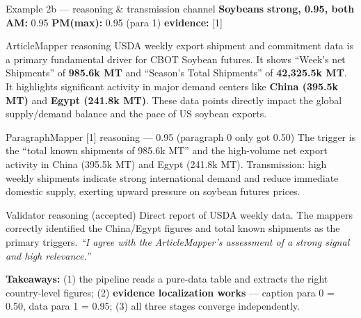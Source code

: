 \documentclass[10pt,aspectratio=169]{beamer}
\begin{document}
\begin{frame}{Example 2b --- reasoning \& transmission channel}
  \scriptsize
  \textbf{\textcolor{triggerblue}{Soybeans}} \quad [commodity] \quad \textbf{strong, 0.95, both}
  \quad \textbf{AM:} 0.95 \quad \textbf{PM(max):} 0.95 (para 1) \quad \textbf{evidence:} [1]

  \vspace{0.3em}
  \begin{block}{ArticleMapper reasoning}
    \scriptsize
    USDA weekly export shipment and commitment data is a primary fundamental driver for CBOT
    Soybean futures. It shows ``Week's net Shipments'' of \textbf{985.6k MT} and ``Season's
    Total Shipments'' of \textbf{42{,}325.5k MT}. It highlights significant activity in major
    demand centers like \textbf{China (395.5k MT)} and \textbf{Egypt (241.8k MT)}. These data
    points directly impact the global supply/demand balance and the pace of US soybean exports.
  \end{block}

  \begin{block}{ParagraphMapper [1] reasoning --- 0.95 (paragraph 0 only got 0.50)}
    \scriptsize
    The trigger is the ``total known shipments of 985.6k MT'' and the high-volume net export
    activity in China (395.5k MT) and Egypt (241.8k MT). Transmission: high weekly shipments
    indicate strong international demand and reduce immediate domestic supply, exerting upward
    pressure on soybean futures prices.
  \end{block}

  \begin{block}{Validator reasoning (accepted)}
    \scriptsize
    Direct report of USDA weekly data. The mappers correctly identified the China/Egypt figures
    and total known shipments as the primary triggers. \emph{``I agree with the ArticleMapper's
    assessment of a strong signal and high relevance.''}
  \end{block}

  \vspace{0.2em}
  \textcolor{goodgreen}{\textbf{Takeaways:}} (1) the pipeline reads a pure-data table and
  extracts the right country-level figures; (2) \textbf{evidence localization works} --- caption
  para 0 = 0.50, data para 1 = 0.95; (3) all three stages converge independently.
\end{frame}
\end{document}
